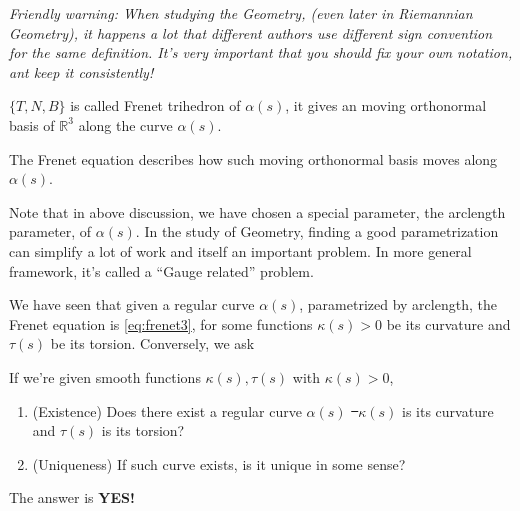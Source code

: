 \itshape{}
Friendly warning: When studying the Geometry, (even later in Riemannian Geometry),
it happens a lot that different authors use different sign convention for the same
definition. It's very important that you should fix your own notation, ant keep it
consistently!
\normalfont{}

\begin{definition}
    \(\{T,N,B\}\) is called Frenet trihedron of \(\alpha(s)\), it gives an moving 
    orthonormal basis of \(\mathbb{R}^3\) along the curve \(\alpha(s)\).
\end{definition}
The Frenet equation describes how such moving orthonormal basis moves along 
\(\alpha(s)\).

\begin{remark}
    Note that in above discussion, we have chosen a special parameter, the arclength
    parameter, of \(\alpha(s)\). In the study of Geometry, finding a good
    parametrization can simplify a lot of work and itself an important problem. In
    more general framework, it's called a ``Gauge related'' problem.
\end{remark}

We have seen that given a regular curve \(\alpha(s)\), parametrized by arclength,
the Frenet equation is \cref{eq:frenet3}, for some functions \(\kappa(s)>0\) be
its curvature and \(\tau(s)\) be its torsion. Conversely, we ask
\begin{question}
    If we're given smooth functions \(\kappa(s),\tau(s)\) with \(\kappa(s)>0\),
    \begin{enumerate}[(1)]
        \item (Existence) Does there exist a regular curve \(\alpha(s)\) \st\ 
            \(\kappa(s)\) is its curvature and \(\tau(s)\) is its torsion?
        \item (Uniqueness) If such curve exists, is it unique in some sense?
    \end{enumerate}
\end{question}
The answer is {\large\bfseries YES!}


